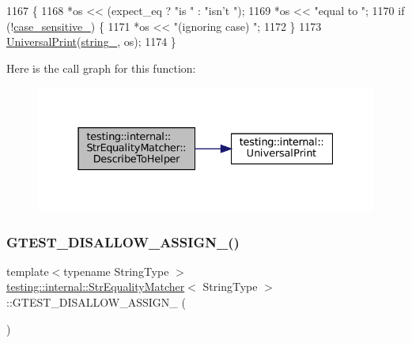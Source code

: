 \begin{DoxyCode}
1167                                                               \{
1168     *os << (expect\_eq ? \textcolor{stringliteral}{"is "} : \textcolor{stringliteral}{"isn't "});
1169     *os << \textcolor{stringliteral}{"equal to "};
1170     \textcolor{keywordflow}{if} (!\hyperlink{classtesting_1_1internal_1_1StrEqualityMatcher_adabf80fed2710950dd44b2a08fa5930c}{case\_sensitive\_}) \{
1171       *os << \textcolor{stringliteral}{"(ignoring case) "};
1172     \}
1173     \hyperlink{namespacetesting_1_1internal_a30708fa2bacf11895b03bdb21eb72309}{UniversalPrint}(\hyperlink{classtesting_1_1internal_1_1StrEqualityMatcher_af6967de4d57d461f3e7c98bece4d1f48}{string\_}, os);
1174   \}
\end{DoxyCode}
Here is the call graph for this function\+:
\nopagebreak
\begin{figure}[H]
\begin{center}
\leavevmode
\includegraphics[width=331pt]{classtesting_1_1internal_1_1StrEqualityMatcher_accddf33055803fee7ff0ef7988204474_cgraph}
\end{center}
\end{figure}
\mbox{\label{classtesting_1_1internal_1_1StrEqualityMatcher_a6d3c1bff5de614e105f93c5d05d49a80}} 
\subsubsection{\texorpdfstring{G\+T\+E\+S\+T\+\_\+\+D\+I\+S\+A\+L\+L\+O\+W\+\_\+\+A\+S\+S\+I\+G\+N\+\_\+()}{GTEST\_DISALLOW\_ASSIGN\_()}}
{\footnotesize\ttfamily template$<$typename String\+Type $>$ \\
\hyperlink{classtesting_1_1internal_1_1StrEqualityMatcher}{testing\+::internal\+::\+Str\+Equality\+Matcher}$<$ String\+Type $>$\+::G\+T\+E\+S\+T\+\_\+\+D\+I\+S\+A\+L\+L\+O\+W\+\_\+\+A\+S\+S\+I\+G\+N\+\_\+ (\begin{DoxyParamCaption}\item[{\hyperlink{classtesting_1_1internal_1_1StrEqualityMatcher}{Str\+Equality\+Matcher}$<$ String\+Type $>$}]{ }\end{DoxyParamCaption})\hspace{0.3cm}{\ttfamily [private]}}

